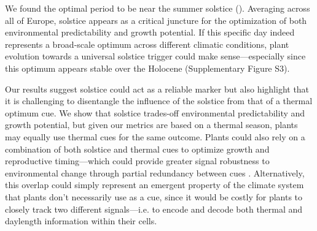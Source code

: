 \documentclass[11pt,letter]{article}
\begin{document}
We found the optimal period to be near the summer solstice (). Averaging across all of Europe, solstice appears as a critical juncture for the optimization of both environmental predictability and growth potential.
If this specific day indeed represents a broad-scale optimum across different climatic conditions, plant evolution towards a universal solstice trigger could make sense---especially since this optimum appears stable over the Holocene (Supplementary Figure S3). %

Our results suggest solstice could act as a reliable marker but also highlight that it is challenging to disentangle the influence of the solstice from that of a thermal optimum cue. %
We show that solstice trades-off environmental predictability and growth potential, but given our metrics are based on a thermal season, plants may equally use thermal cues for the same outcome.
Plants could also rely on a combination of both solstice and thermal cues to optimize growth and reproductive timing---which could provide greater signal robustness to environmental change through partial redundancy between cues \citep{Bonamour2019}.
Alternatively, this overlap could simply represent an emergent property of the climate system that plants don't necessarily use as a cue, since it would be costly for plants to closely track two different signals---i.e. to encode and decode both thermal and daylength information within their cells. 
\end{document}
